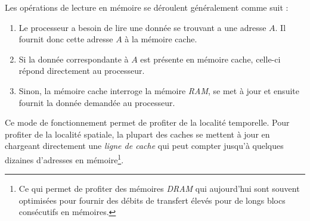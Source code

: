 Les opérations de lecture en mémoire se déroulent généralement comme suit :
\begin{enumerate}
  \item[1.] Le processeur a besoin de lire une donnée se trouvant a une adresse $A$.
    Il fournit donc cette adresse $A$ à la mémoire cache.
  \item[2a.] Si la donnée correspondante à $A$ est présente en mémoire cache, celle-ci répond directement au processeur.
  \item[2b.] Sinon, la mémoire cache interroge la mémoire \textit{RAM}, se met à jour et ensuite fournit la donnée demandée au processeur.
\end{enumerate}
Ce mode de fonctionnement permet de profiter de la localité temporelle.
Pour profiter de la localité spatiale, la plupart des caches se mettent à jour en chargeant directement une \textit{ligne de cache} qui peut compter jusqu'à quelques dizaines d'adresses en mémoire\footnote{Ce qui permet de profiter des mémoires \textit{DRAM} qui aujourd'hui sont souvent optimisées pour fournir des débits de transfert élevés pour de longs blocs consécutifs en mémoires.}.

